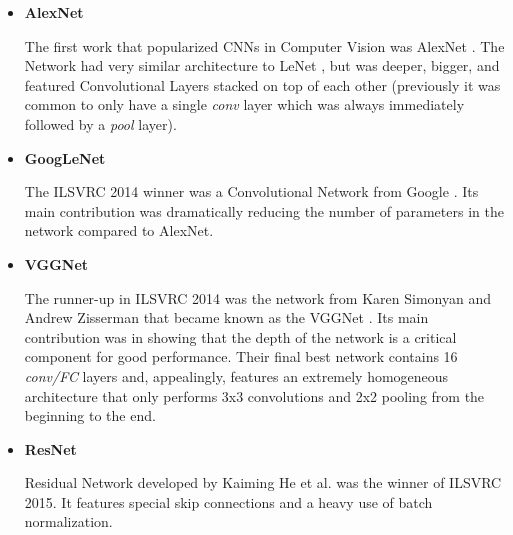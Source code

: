 \begin{itemize}
	\item \textbf{AlexNet}
	
	The first work that popularized CNNs in Computer Vision was AlexNet \cite{krizhevsky}. The Network had very similar architecture to LeNet \cite{lecun}, but was deeper, bigger, and featured Convolutional Layers stacked on top of each other (previously it was common to only have a single \textit{conv} layer which was always immediately followed by a \textit{pool} layer). \cite{stanford-github}
	
	\item \textbf{GoogLeNet}
	
	The ILSVRC 2014 winner was a Convolutional Network from Google \cite{szegedy}. Its main contribution was dramatically reducing the number of parameters in the network compared to AlexNet. \cite{stanford-github}
	
	\item \textbf{VGGNet}
	
	The runner-up in ILSVRC 2014 was the network from Karen Simonyan and Andrew Zisserman that became known as the VGGNet \cite{vgg}. Its main contribution was in showing that the depth of the network is a critical component for good performance. Their final best network contains 16 \textit{conv/FC} layers and, appealingly, features an extremely homogeneous architecture that only performs 3x3 convolutions and 2x2 pooling from the beginning to the end. \cite{stanford-github}
	
	\item \textbf{ResNet}
	
  	Residual Network developed by Kaiming He et al. \cite{resnet} was the winner of ILSVRC 2015. It features special skip connections and a heavy use of batch normalization. \cite{stanford-github}
		 
\end{itemize}






